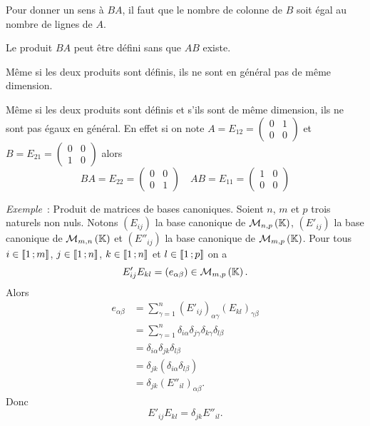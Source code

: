 \danger Pour donner un sens à \(BA\), il faut que le nombre de colonne de \(B\) soit égal au nombre de lignes de \(A\).

\danger Le produit \(BA\) peut être défini sans que \(AB\) existe.

\danger Même si les deux produits sont définis, ils ne sont en général pas de même dimension.

\danger Même si les deux produits sont définis et s'ils sont de même dimension, ils ne sont pas égaux en général. En effet si on note \(A=E_{12}=\begin{pmatrix} 0 & 1 \\ 0 & 0 \end{pmatrix}\) et \(B=E_{21}=\begin{pmatrix} 0 & 0 \\ 1 & 0 \end{pmatrix}\) alors
\begin{equation}
  BA = E_{22} = \begin{pmatrix} 0 & 0 \\ 0 & 1 \end{pmatrix} \quad AB = E_{11} = \begin{pmatrix} 1 & 0 \\ 0 & 0 \end{pmatrix}
\end{equation}


\emph{Exemple}~: Produit de matrices de bases canoniques. Soient \(n\), \(m\) et \(p\) trois naturels non nuls. Notons \((E_{ij})\) la base canonique de \(\mathcal{M}_{n,p}\left(\mathbb{K}\right)\), \((E'_{ij})\) la base canonique de \(\mathcal{M}_{m,n}\left(\mathbb{K}\right)\) et \((E''_{ij})\) la base canonique de \(\mathcal{M}_{m,p}\left(\mathbb{K}\right)\). Pour tous \(i \in \mathopen{\llbracket}1\mathclose{}\mathpunct{};m\mathclose{\rrbracket}\), \(j \in \mathopen{\llbracket}1\mathclose{}\mathpunct{};n\mathclose{\rrbracket}\), \(k \in \mathopen{\llbracket}1\mathclose{}\mathpunct{};n\mathclose{\rrbracket}\) et \(l \in \mathopen{\llbracket}1\mathclose{}\mathpunct{};p\mathclose{\rrbracket}\) on a
\begin{equation}
  E'_{ij} E_{kl} =(e_{\alpha \beta}) \in \mathcal{M}_{m,p}\left(\mathbb{K}\right).
\end{equation}
Alors
\begin{align}
  e_{\alpha \beta} &=\sum_{\gamma=1}^n (E'_{ij})_{\alpha \gamma} (E_{kl})_{\gamma \beta}\\
  &=\sum_{\gamma=1}^n \delta_{i\alpha} \delta_{j\gamma} \delta_{k\gamma} \delta_{l\beta} \\
  &= \delta_{i\alpha} \delta_{jk} \delta_{l\beta}\\
  &= \delta_{jk} (\delta_{i\alpha} \delta_{l\beta})\\
  &= \delta_{jk} (E''_{il})_{\alpha\beta}.
\end{align}
Donc
\begin{equation}
  E'_{ij} E_{kl} = \delta_{jk} E''_{il}.
\end{equation}

